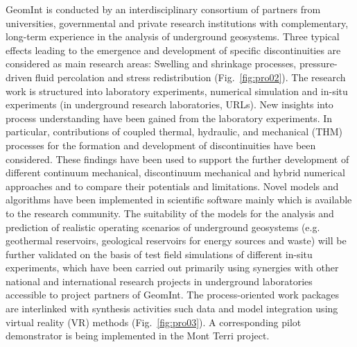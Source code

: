 GeomInt is conducted by an interdisciplinary consortium of partners from universities, governmental and private research institutions with complementary, long-term experience in the analysis of underground geosystems. Three typical effects leading to the emergence and development of specific discontinuities are considered as main research areas: Swelling and shrinkage processes, pressure-driven fluid percolation and stress redistribution (Fig.~\ref{fig:pro02}). The research work is structured into laboratory experiments, numerical simulation and in-situ experiments (in underground research laboratories, URLs). New insights into process understanding have been gained from the laboratory experiments. In particular, contributions of coupled thermal, hydraulic, and mechanical (THM) processes for the formation and development of discontinuities have been considered. These findings have been used to support the further development of different continuum mechanical, discontinuum mechanical and hybrid numerical approaches and to compare their potentials and limitations. Novel models and algorithms have been implemented in scientific software mainly which is available to the research community. The suitability of the models for the analysis and prediction of realistic operating scenarios of underground geosystems (e.g. geothermal reservoirs, geological reservoirs for energy sources and waste) will be further validated on the basis of test field simulations of different in-situ experiments, which have been carried out primarily using synergies with other national and international research projects in underground laboratories accessible to project partners of GeomInt.
%
The process-oriented work packages are interlinked with synthesis activities such data and model integration using virtual reality (VR) methods (Fig.~\ref{fig:pro03}). A corresponding pilot demonstrator is being implemented in the Mont Terri project.

